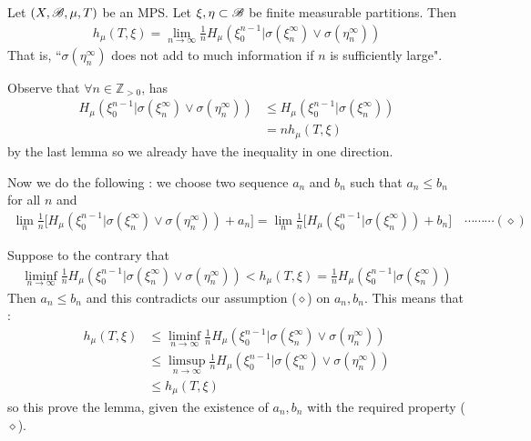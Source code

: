 \documentclass[12pt,a4paper]{report}
\newenvironment{proof}
{\begin{changemargin}{1cm}{0.5cm} 
	}%
	{\end{changemargin}
}
\begin{document}
\lem Let $(X, \mathscr{B}, \mu, T)$ be an MPS. Let $\xi, \eta \subset \mathscr{B}$ be finite measurable partitions. Then
\begin{align*}
h_{\mu}(T, \xi) = \lim_{n\rightarrow \infty} \frac{1}{n} H_{\mu} (\xi_0^{n-1} | \sigma(\xi_n^{\infty}) \vee \sigma(\eta_n^{\infty})  )
\end{align*}
That is, ``$\sigma(\eta_n^{\infty})$ does not add to much information if $n$ is sufficiently large". 
\begin{proof}
\pf Observe that $\forall n \in \mathbb{Z}_{>0}$, has
\begin{align*}
H_{\mu}(\xi_0^{n-1} | \sigma(\xi_n^{\infty}) \vee \sigma(\eta_n^{\infty})) &\leq H_{\mu} (\xi_0^{n-1} | \sigma(\xi_n^{\infty})) \\
&= nh_{\mu}(T, \xi)
\end{align*}
by the last lemma so we already have the inequality in one direction.

\quad Now we do the following : we choose two sequence $a_n$ and $b_n$ such that $a_n \leq b_n$ for all $n$ and
\begin{align*}
\lim_{n} \frac{1}{n} \Big[ H_{\mu}(\xi_0^{n-1} | \sigma(\xi_n^{\infty}) \vee \sigma(\eta_n^{\infty})) + a_n \Big] = \lim_{n} \frac{1}{n} \Big[ H_{\mu}(\xi_0^{n-1} | \sigma(\xi_n^{\infty})) + b_n \Big] \quad \cdots\cdots\cdots (\diamond)
\end{align*}

Suppose to the contrary that
\begin{align*}
\liminf_{n\rightarrow \infty} \frac{1}{n} H_{\mu}(\xi_0^{n-1} | \sigma(\xi_n^{\infty}) \vee \sigma(\eta_n^{\infty})) < h_{\mu}(T, \xi) = \frac{1}{n} H_{\mu}(\xi_0^{n-1} | \sigma(\xi_n^{\infty}))
\end{align*}
Then $a_n \leq b_n$ and this contradicts our assumption ($\diamond$) on $a_n, b_n$. This means that :
\begin{align*}
h_{\mu}(T, \xi) &\leq \liminf_{n\rightarrow \infty} \frac{1}{n} H_{\mu} (\xi_0^{n-1} | \sigma(\xi_n^{\infty}) \vee \sigma(\eta_n^{\infty})) \\
&\leq \limsup_{n\rightarrow \infty} \frac{1}{n} H_{\mu} (\xi_0^{n-1} | \sigma(\xi_n^{\infty}) \vee \sigma(\eta_n^{\infty})) \\
&\leq h_{\mu}(T,\xi)
\end{align*}
so this prove the lemma, given the existence of $a_n, b_n$ with the required property ($\diamond$).
\s


\end{proof}
\end{document}
